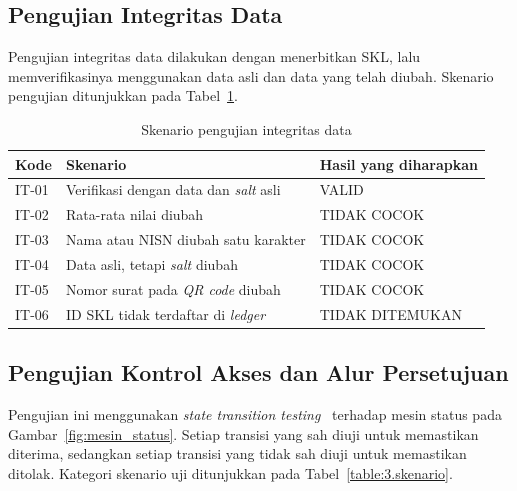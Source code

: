\subsection{Pengujian Integritas Data}
Pengujian integritas data dilakukan dengan menerbitkan SKL, lalu memverifikasinya menggunakan data asli dan data yang telah diubah. Skenario pengujian ditunjukkan pada Tabel~\ref{table:3.integritas}.

\begin{table}[H]
    \centering
    \caption{Skenario pengujian integritas data}
    \label{table:3.integritas}
    \footnotesize
    \renewcommand{\arraystretch}{1.25}
    \begin{tabular}{|>{\raggedright\arraybackslash}p{}|>{\raggedright\arraybackslash}p{}|>{\raggedright\arraybackslash}p{}|}
        \hline
        \textbf{Kode} & \textbf{Skenario} & \textbf{Hasil yang diharapkan} \\
        \hline
        IT-01 & Verifikasi dengan data dan \textit{salt} asli & VALID \\
        \hline
        IT-02 & Rata-rata nilai diubah & TIDAK COCOK \\
        \hline
        IT-03 & Nama atau NISN diubah satu karakter & TIDAK COCOK \\
        \hline
        IT-04 & Data asli, tetapi \textit{salt} diubah & TIDAK COCOK \\
        \hline
        IT-05 & Nomor surat pada \textit{QR code} diubah & TIDAK COCOK \\
        \hline
        IT-06 & ID SKL tidak terdaftar di \textit{ledger} & TIDAK DITEMUKAN \\
        \hline
    \end{tabular}
\end{table}

\subsection{Pengujian Kontrol Akses dan Alur Persetujuan}
Pengujian ini menggunakan \textit{state transition testing}~\cite{Augenio2025StateTransition} terhadap mesin status pada Gambar~\ref{fig:mesin_status}. Setiap transisi yang sah diuji untuk memastikan diterima, sedangkan setiap transisi yang tidak sah diuji untuk memastikan ditolak. Kategori skenario uji ditunjukkan pada Tabel~\ref{table:3.skenario}.

